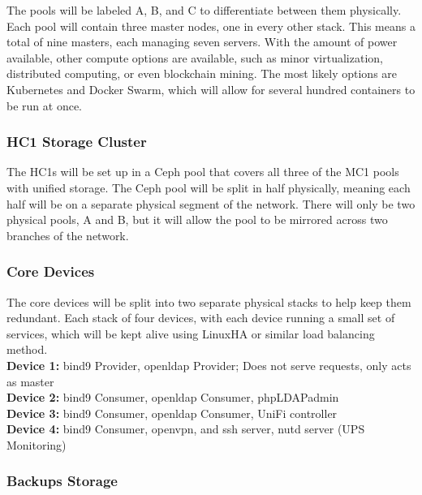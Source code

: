 \documentclass[12pt]{spieman}  %
\begin{document}
The pools will be labeled A, B, and C to differentiate between them physically. Each pool will contain three master nodes, one in every other stack. This means a total of nine masters, each managing seven servers. With the amount of power available, other compute options are available, such as minor virtualization, distributed computing, or even blockchain mining. The most likely options are Kubernetes and Docker Swarm, which will allow for several hundred containers to be run at once.

\subsubsection{HC1 Storage Cluster}
\label{subsubsec:arm-usage-hc1-storage}

The HC1s will be set up in a Ceph pool that covers all three of the MC1 pools with unified storage. The Ceph pool will be split in half physically, meaning each half will be on a separate physical segment of the network. There will only be two physical pools, A and B, but it will allow the pool to be mirrored across two branches of the network. 

\subsubsection{Core Devices}
\label{subsubsec:arm-usage-core}

The core devices will be split into two separate physical stacks to help keep them redundant. Each stack of four devices, with each device running a small set of services, which will be kept alive using LinuxHA or similar load balancing method.\\

\textbf{Device 1:} bind9 Provider, openldap Provider; Does not serve requests, only acts as master\\

\textbf{Device 2:} bind9 Consumer, openldap Consumer, phpLDAPadmin\\

\textbf{Device 3:} bind9 Consumer, openldap Consumer, UniFi controller\\

\textbf{Device 4:} bind9 Consumer, openvpn, and ssh server, nutd server (UPS Monitoring)\\

\subsubsection{Backups Storage}
\label{subsubsec:arm-usage-backups}
\end{document}
